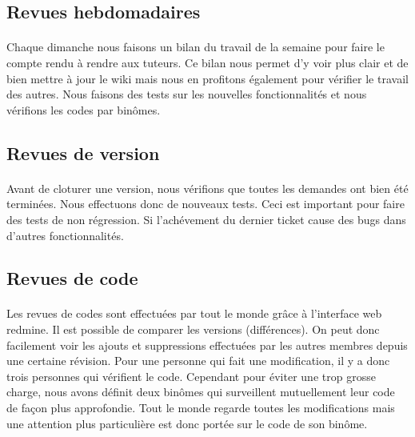 \subsection{Revues hebdomadaires}

\paragraph{}
Chaque dimanche nous faisons un bilan du travail de la semaine pour faire le compte rendu à rendre aux tuteurs. Ce bilan nous permet d'y voir plus clair et de bien mettre à jour le wiki mais nous en profitons également pour vérifier le travail des autres. Nous faisons des tests sur les nouvelles fonctionnalités et nous vérifions les codes par binômes.

\subsection{Revues de version}

\paragraph{}
Avant de cloturer une version, nous vérifions que toutes les demandes ont bien été terminées. Nous effectuons donc de nouveaux tests. Ceci est important pour faire des tests de non régression. Si l'achévement du dernier ticket cause des bugs dans d'autres fonctionnalités.

\subsection{Revues de code}

\paragraph{}
Les revues de codes sont effectuées par tout le monde grâce à l'interface web redmine. Il est possible de comparer les versions (différences). On peut donc facilement voir les ajouts et suppressions effectuées par les autres membres depuis une certaine révision. Pour une personne qui fait une modification, il y a donc trois personnes qui vérifient le code. Cependant pour éviter une trop grosse charge, nous avons définit deux binômes qui surveillent mutuellement leur code de façon plus approfondie. Tout le monde regarde toutes les modifications mais une attention plus particulière est donc portée sur le code de son binôme.